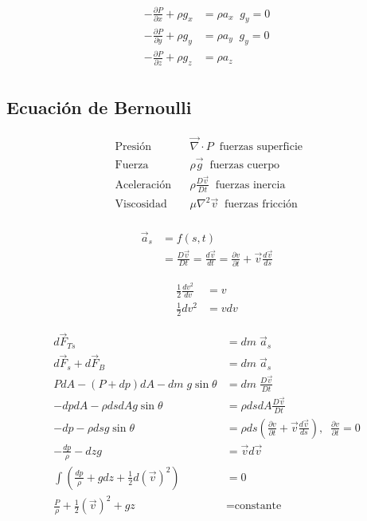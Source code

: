 \[
    \begin{split}
        -\frac{ \partial P }{ \partial x } + \rho g_{x} & = \rho a_{x} \;\; g_{y} = 0 \\
        -\frac{ \partial P }{ \partial y } + \rho g_{y} & = \rho a_{y} \;\; g_{y} = 0 \\
        -\frac{ \partial P }{ \partial z } + \rho g_{z} & = \rho a_{z} \\
    \end{split}
\]

\subsection{Ecuación de Bernoulli}


\[
    \begin{split}
        \text{ Presión } \;\; & \vec{ \nabla } \cdot P \;\; \text{fuerzas superficie} \\
        \text{ Fuerza } \;\; & \rho \vec{g} \;\; \text{fuerzas cuerpo} \\
        \text{ Aceleración } \;\; & \rho \frac{ D \vec{v} }{ Dt } \;\; \text{fuerzas inercia} \\
        \text{ Viscosidad } \;\; & \mu \nabla^{2} \vec{v} \;\; \text{fuerzas fricción} \\
    \end{split}
\]

\[
    \begin{split}
        \vec{a}_{s} & = f(s, t) \\
        & = \frac{ D \vec{v} }{ Dt } = \frac{ d \vec{v} }{ dt } = \frac{ \partial v }{ \partial t } + \vec{v} \frac{ d \vec{v} }{ ds }
    \end{split}
\]

\[
    \begin{split}
        \frac{ 1 }{ 2 } \frac{ dv^{2} }{ dv } & = v \\
        \frac{ 1 }{ 2 } dv^{2} & = vdv 
    \end{split}
\]

\[
    \begin{split}
        d\vec{F}_{Ts} & = dm \; \vec{a}_{s} \\
        d\vec{F}_{s} + d\vec{F}_{B} & = dm \; \vec{a}_{s} \\
        PdA - (P + dp) dA - dm \; g\sin{ \theta } & = dm \; \frac{ D \vec{v} }{ Dt } \\
        -dpdA - \rho ds dA g \sin{ \theta } & = \rho ds dA \frac{ D\vec{v} }{ Dt } \\
        -dp - \rho ds g \sin{ \theta } & = \rho ds ( \frac{ \partial v }{ \partial t } + \vec{v} \frac{ d\vec{v} }{ ds } ), \;\; \frac{ \partial v }{ \partial t } = 0 \\
        -\frac{ dp }{ \rho } - dzg & = \vec{v} d\vec{v} \\
        \int ( \frac{ dp }{ \rho } +gdz + \frac{  1 }{ 2 } d(\vec{v})^{2} ) & = 0 \\
         \frac{ P }{ \rho } + \frac{ 1 }{ 2 } (\vec{v})^{2} + gz & = \text{constante} \\
    \end{split}
\]

